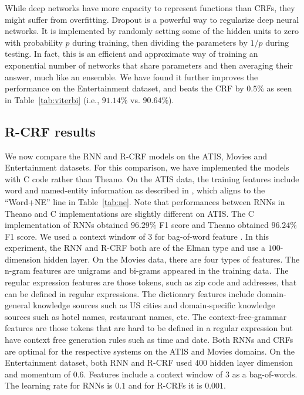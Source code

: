 While deep networks have more capacity to represent functions than CRFs, they
might suffer from overfitting. Dropout \citep{rnn10} is a powerful way to regularize
deep neural networks. It is implemented by randomly setting some of the hidden
units to zero with probability $p$ during training, then dividing the parameters
by $1 / p$ during testing. In fact, this is an efficient and approximate way of
training an exponential number of networks that share parameters and then
averaging their answer, much like an ensemble. We have found it further
improves the performance on the Entertainment dataset, and beats the CRF by
$0.5\%$ as seen in Table~\ref{tab:viterbi} (i.e., $91.14\%$ vs. $90.64\%$). 

\subsection{R-CRF results}

We now compare the RNN and R-CRF models on the ATIS, Movies and Entertainment
datasets. For this comparison, we have implemented the models with C code
rather than Theano. On the ATIS data, the training features include word and
named-entity information as described in \citep{rnn29}, which aligns to the “Word+NE”
line in Table~\ref{tab:ne}. Note that performances between RNNs in Theano and C
implementations are slightly different on ATIS. The C implementation of RNNs
obtained $96.29\%$ F1 score and Theano obtained $96.24\%$ F1 score. We used a
context window of $3$ for bag-of-word feature \citep{rnn24}. In this experiment, the RNN
and R-CRF both are of the Elman type and use a $100$-dimension hidden layer. On
the Movies data, there are four types of features. The n-gram features are
unigrams and bi-grams appeared in the training data. The regular expression
features are those tokens, such as zip code and addresses, that can be defined
in regular expressions. The dictionary features include domain-general
knowledge sources such as US cities and domain-specific knowledge sources such
as hotel names, restaurant names, etc. The context-free-grammar features are
those tokens that are hard to be defined in a regular expression but have
context free generation rules such as time and date. Both RNNs and CRFs are
optimal for the respective systems on the ATIS and Movies domains. On the
Entertainment dataset, both RNN and R-CRF used $400$ hidden layer dimension and
momentum of $0.6$. Features include a context window of $3$ as a bag-of-words. The
learning rate for RNNs is $0.1$ and for R-CRFs it is $0.001$. 

